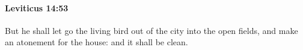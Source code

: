 
		\paragraph{Leviticus 14:53} %
			\label{LEVITICUS-14-53}

			But he shall let go the living bird out of the city into the open fields, and make an atonement for the house: and it shall be clean.


